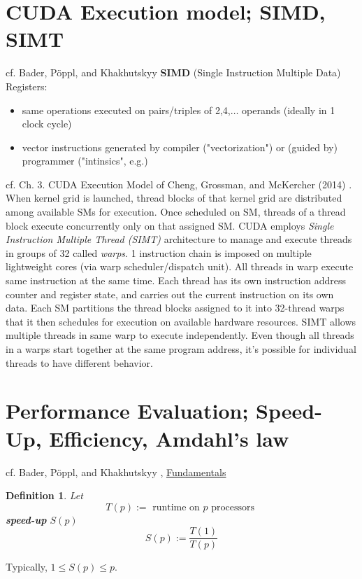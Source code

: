 \documentclass[10pt]{amsart}
\newtheorem{definition}{Definition}
\begin{document}
\begin{multicols*}{2}
\section{CUDA Execution model; SIMD, SIMT}
cf. Bader, P\"{o}ppl, and Khakhutskyy \cite{BaPK2016}  
\textbf{SIMD} (Single Instruction Multiple Data) Registers: 
\begin{itemize}
	\item same operations executed on pairs/triples of 2,4,$\dots$ operands (ideally in 1 clock cycle)
	\item vector instructions generated by compiler ("vectorization") or (guided by) programmer ("intinsics", e.g.)
\end{itemize} 
cf. Ch. 3.  CUDA Execution Model of Cheng, Grossman, and McKercher (2014) \cite{CGM2014}.  
When kernel grid is launched, thread blocks of that kernel grid are distributed among available SMs for execution.  Once scheduled on SM, threads of a thread block execute concurrently only on that assigned SM.  
CUDA employs \emph{Single Instruction Multiple Thread (SIMT)} architecture to manage and execute threads in groups of 32 called \emph{warps}.  
1 instruction chain is imposed on multiple lightweight cores (via warp scheduler/dispatch unit)\cite{BaPK2016}.  
All threads in warp execute same instruction at the same time.  Each thread has its own instruction address counter and register state, and carries out the current instruction on its own data.  Each SM partitions the thread blocks assigned to it into 32-thread warps that it then schedules for execution on available hardware resources.  
SIMT allows multiple threads in same warp to execute independently.  Even though all threads in a warps start together at the same program address, it's possible for individual threads to have different behavior.  
\section{Performance Evaluation; Speed-Up, Efficiency, Amdahl's law}
cf. Bader, P\"{o}ppl, and Khakhutskyy \cite{BaPK2016}, \href{https://www5.in.tum.de/lehre/vorlesungen/hpc/WS16/fundamentals.pdf}{Fundamentals}
\begin{definition}
	Let
	\begin{equation}
	T(p):= \text{ runtime on $p$ processors }
	\end{equation}
	\textbf{speed-up} $S(p)$
	\begin{equation}
	S(p):= \frac{T(1)}{T(p)}
	\end{equation}
\end{definition}
Typically, $1\leq S(p) \leq p$.  

\end{multicols*}
\end{document}
